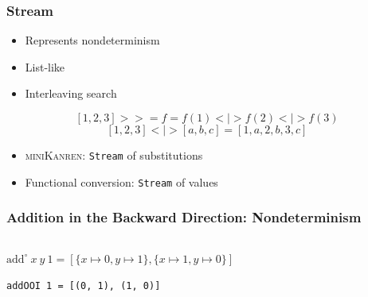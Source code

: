 \documentclass[xcolor=table, aspectratio=169]{beamer}
\newcommand{\mk}{\textsc{miniKanren}\xspace}
\begin{document}
\begin{frame}[fragile]
  \frametitle{Stream}

  \begin{center}
    \begin{minipage}{0.4\textwidth}
      \begin{itemize}
          \item Represents nondeterminism
          \item List-like
          \item Interleaving search
      \end{itemize}
    \end{minipage}
  \end{center}

\vfill

  \begin{center}
      \[ \left[1, 2, 3\right] >>= f = f(1) < \mid > f(2) < \mid > f(3)\] 
      \[ \left[1, 2, 3\right] < \mid > \left[a, b, c\right] = \left[1, a, 2, b, 3, c\right] \] 
  \end{center}

  \vfill

  \begin{center}
    \begin{minipage}{0.5\textwidth}
      \begin{itemize}
          \item \mk: \lstinline{Stream} of substitutions
          \item Functional conversion: \lstinline{Stream} of values
      \end{itemize}
    \end{minipage}
  \end{center}
\end{frame}


\begin{frame}[fragile]
  \frametitle{Addition in the Backward Direction: Nondeterminism}
\begin{columns}
  \begin{column}[t]{0.49\textwidth}
    
  \end{column}
  \begin{column}[t]{0.49\textwidth}
    
  \end{column}
\end{columns}

\vfill
$\text{add}^{\circ}\ x\ y\ 1 = \left[\{x \mapsto  0, y \mapsto  1\}, \{x \mapsto  1, y \mapsto  0\} \right]$

\vfill

\lstinline{addOOI 1 = [(0, 1), (1, 0)]}

\end{frame}
\end{document}

